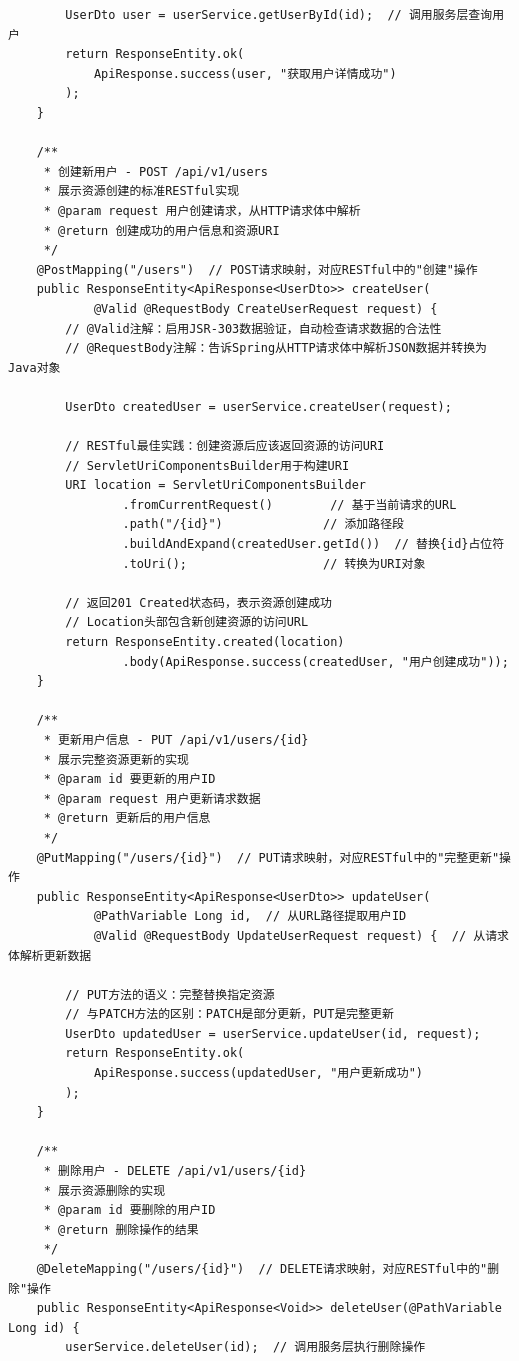 \begin{lstlisting}
        UserDto user = userService.getUserById(id);  // 调用服务层查询用户
        return ResponseEntity.ok(
            ApiResponse.success(user, "获取用户详情成功")
        );
    }
    
    /**
     * 创建新用户 - POST /api/v1/users
     * 展示资源创建的标准RESTful实现
     * @param request 用户创建请求，从HTTP请求体中解析
     * @return 创建成功的用户信息和资源URI
     */
    @PostMapping("/users")  // POST请求映射，对应RESTful中的"创建"操作
    public ResponseEntity<ApiResponse<UserDto>> createUser(
            @Valid @RequestBody CreateUserRequest request) {
        // @Valid注解：启用JSR-303数据验证，自动检查请求数据的合法性
        // @RequestBody注解：告诉Spring从HTTP请求体中解析JSON数据并转换为Java对象
        
        UserDto createdUser = userService.createUser(request);
        
        // RESTful最佳实践：创建资源后应该返回资源的访问URI
        // ServletUriComponentsBuilder用于构建URI
        URI location = ServletUriComponentsBuilder
                .fromCurrentRequest()        // 基于当前请求的URL
                .path("/{id}")              // 添加路径段
                .buildAndExpand(createdUser.getId())  // 替换{id}占位符
                .toUri();                   // 转换为URI对象
                
        // 返回201 Created状态码，表示资源创建成功
        // Location头部包含新创建资源的访问URL
        return ResponseEntity.created(location)
                .body(ApiResponse.success(createdUser, "用户创建成功"));
    }
    
    /**
     * 更新用户信息 - PUT /api/v1/users/{id}
     * 展示完整资源更新的实现
     * @param id 要更新的用户ID
     * @param request 用户更新请求数据
     * @return 更新后的用户信息
     */
    @PutMapping("/users/{id}")  // PUT请求映射，对应RESTful中的"完整更新"操作
    public ResponseEntity<ApiResponse<UserDto>> updateUser(
            @PathVariable Long id,  // 从URL路径提取用户ID
            @Valid @RequestBody UpdateUserRequest request) {  // 从请求体解析更新数据
        
        // PUT方法的语义：完整替换指定资源
        // 与PATCH方法的区别：PATCH是部分更新，PUT是完整更新
        UserDto updatedUser = userService.updateUser(id, request);
        return ResponseEntity.ok(
            ApiResponse.success(updatedUser, "用户更新成功")
        );
    }
    
    /**
     * 删除用户 - DELETE /api/v1/users/{id}
     * 展示资源删除的实现
     * @param id 要删除的用户ID
     * @return 删除操作的结果
     */
    @DeleteMapping("/users/{id}")  // DELETE请求映射，对应RESTful中的"删除"操作
    public ResponseEntity<ApiResponse<Void>> deleteUser(@PathVariable Long id) {
        userService.deleteUser(id);  // 调用服务层执行删除操作
        

\end{lstlisting}
